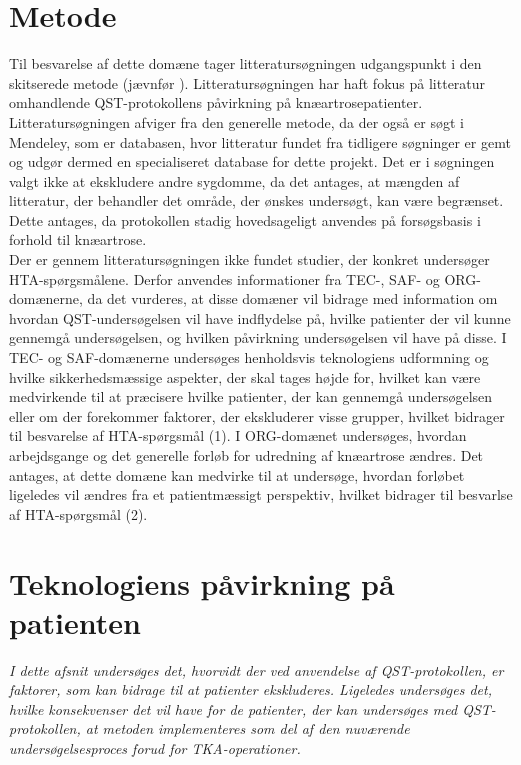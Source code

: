 \section{Metode}
Til besvarelse af dette domæne tager litteratursøgningen udgangspunkt i den skitserede metode (jævnfør ). Litteratursøgningen har haft fokus på litteratur omhandlende QST-protokollens påvirkning på knæartrosepatienter. Litteratursøgningen afviger fra den generelle metode, da der også er søgt i Mendeley, som er databasen, hvor litteratur fundet fra tidligere søgninger er gemt og udgør dermed en specialiseret database for dette projekt.  Det er i søgningen valgt ikke at ekskludere andre sygdomme, da det antages, at mængden af litteratur, der behandler det område, der ønskes undersøgt, kan være begrænset. Dette antages, da protokollen stadig hovedsageligt anvendes på forsøgsbasis i forhold til knæartrose.\\
Der er gennem litteratursøgningen ikke fundet studier, der konkret undersøger HTA-spørgsmålene. Derfor anvendes informationer fra TEC-, SAF- og ORG-domænerne, da det vurderes, at disse domæner vil bidrage med information om hvordan QST-undersøgelsen vil have indflydelse på, hvilke patienter der vil kunne gennemgå undersøgelsen, og hvilken påvirkning undersøgelsen vil have på disse. I TEC- og SAF-domænerne undersøges henholdsvis teknologiens udformning og hvilke sikkerhedsmæssige aspekter, der skal tages højde for, hvilket kan være medvirkende til at præcisere hvilke patienter, der kan gennemgå undersøgelsen eller om der forekommer faktorer, der ekskluderer visse grupper, hvilket bidrager til besvarelse af HTA-spørgsmål (1). I ORG-domænet undersøges, hvordan arbejdsgange og det generelle forløb for udredning af knæartrose ændres. Det antages, at dette domæne kan medvirke til at undersøge, hvordan forløbet ligeledes vil ændres fra et patientmæssigt perspektiv, hvilket bidrager til besvarlse af HTA-spørgsmål (2).     
 
\section{Teknologiens påvirkning på patienten}
\textit{I dette afsnit undersøges det, hvorvidt der ved anvendelse af QST-protokollen, er faktorer, som kan bidrage til at patienter ekskluderes. Ligeledes undersøges det, hvilke konsekvenser det vil have for de patienter, der kan undersøges med QST-protokollen, at metoden implementeres som del af den nuværende undersøgelsesproces forud for TKA-operationer.}

